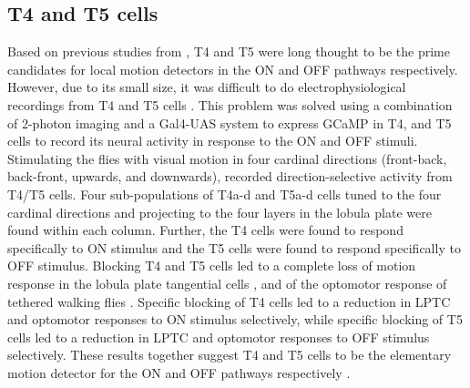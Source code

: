 \subsection{T4 and T5 cells}
Based on previous studies from \parencite{Fischbach1989, Buchner1984}, T4 and T5 were long thought to be the prime candidates for local motion detectors in the ON and OFF pathways respectively. However, due to its small size, it was difficult to do electrophysiological recordings from T4 and T5 cells \parencite{Douglass1996}. This problem was solved using a combination of 2-photon imaging and a Gal4-UAS system to express GCaMP in T4, and T5 cells to record its neural activity in response to the ON and OFF stimuli. Stimulating the flies with visual motion in four cardinal directions (front-back, back-front, upwards, and downwards), \cite{Maisak2013} recorded direction-selective activity from T4/T5 cells. Four sub-populations of T4a-d and T5a-d cells tuned to the four cardinal directions and projecting to the four layers in the lobula plate were found within each column. Further, the T4 cells were found to respond specifically to ON stimulus and the T5 cells were found to respond specifically to OFF stimulus. Blocking T4 and T5 cells led to a complete loss of motion response in the lobula plate tangential cells \parencite{Schnell2012}, and of the optomotor response of tethered walking flies \parencite{Bahl2013}. Specific blocking of T4 cells led to a reduction in LPTC and optomotor responses to ON stimulus selectively, while specific blocking of T5 cells led to a reduction in LPTC and optomotor responses to OFF stimulus selectively. These results together suggest T4 and T5 cells to be the elementary motion detector for the ON and OFF pathways respectively \parencite{Maisak2013}.      

